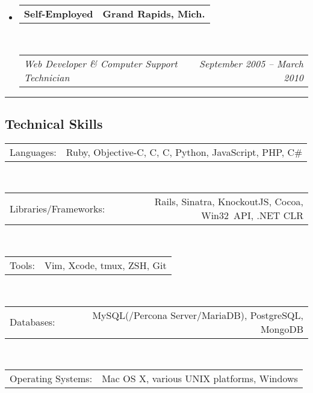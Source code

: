 \documentclass[12pt,letterpaper]{article}
\makeatletter
\newenvironment{indentedsection}[1]
{\begin{list}{}
  {\setlength{\leftmargin}{#1}}
  \item[]
}
{\end{list}}
\newcommand{\floatcols}[2]
{\begin{tabular*}{\linewidth}{l@{\extracolsep{\fill}}r}
  #1 &
  #2 \\
\end{tabular*}}
\newcommand{\CPP}
{C\nolinebreak[4]\hspace{-.05em}\raisebox{.22ex}{\footnotesize\bf ++}}
\makeatother
\begin{document}
\begin{itemize}
  \item
    \floatcols
      {\textbf{Self-Employed}}
      {\textbf{Grand Rapids, Mich.}}
    \\
    \floatcols
      {\emph{Web Developer \& Computer Support Technician}}
      {\emph{September 2005 -- March 2010}}
\end{itemize}


\hrule
\vspace{-0.4em}
\subsection*{Technical Skills}

\begin{indentedsection}{\parindent}
  \floatcols
    {Languages:}
    {Ruby, Objective-C, C, \CPP, Python, JavaScript, PHP, C\#}
  \\[.4em]
  \floatcols
    {Libraries/Frameworks:}
    {Rails, Sinatra, KnockoutJS, Cocoa, Win32~API, .NET CLR}
  \\[.4em]
  \floatcols
    {Tools:}
    {Vim, Xcode, tmux, ZSH, Git}
  \\[.4em]
  \floatcols
    {Databases:}
    {MySQL(/Percona Server/MariaDB), PostgreSQL, MongoDB}
  \\[.4em]
  \floatcols
    {Operating Systems:}
    {Mac OS X, various UNIX platforms, Windows}
\end{indentedsection}
\end{document}
